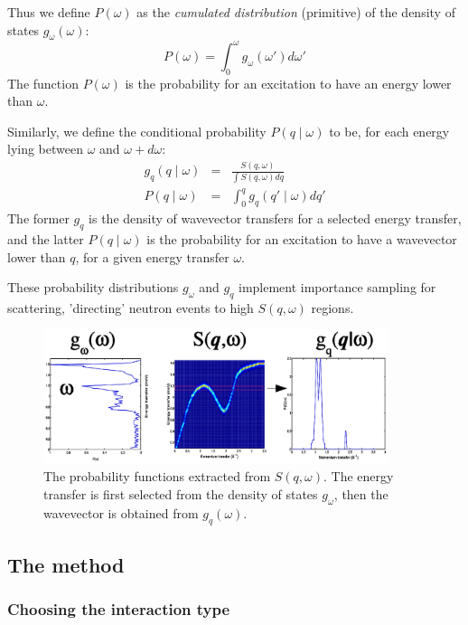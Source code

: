Thus we define $P(\omega)$ as the \emph{cumulated distribution} (primitive) of the density of states $g_{\omega}(\omega)$:
\begin{equation}\label{eq:Pw}
P(\omega) = \int_0^\omega g_{\omega}(\omega') d\omega'
\end{equation}
The function $P(\omega)$ is the probability for an excitation to have an energy lower than $\omega$.

Similarly, we define the conditional probability $P(q \mid \omega)$ to be, for each energy lying between $\omega$ and $\omega+d\omega$:
\begin{eqnarray}\label{eq:Pqw}
g_q(q\mid\omega) &=& \frac{S(q, \omega)}{\int S(q,\omega) dq} \\
P(q \mid \omega)    &=& \int_0^q g_q(q'\mid\omega) dq'
\end{eqnarray}
The former $g_q$ is the density of wavevector transfers for a selected energy transfer, and the latter $P(q \mid \omega)$ is the probability for an excitation to have a wavevector lower than $q$, for a given energy transfer $\omega$.

These probability distributions $g_\omega$ and $g_q$ implement importance sampling for scattering, 'directing' neutron events to high $S(q,\omega)$ regions.

\begin{figure}
  \begin{center}
    \includegraphics[width=0.9\textwidth]{figures/Sqw_sampling.eps}
  \end{center}
\caption{The probability functions extracted from $S(q,\omega)$. The energy transfer is first selected from the density of states $g_\omega$, then the wavevector is obtained from $g_q(\omega)$.}
\label{f:isotropic-sqw}
\end{figure}


\subsection{The method}

\subsubsection{Choosing the interaction type}

